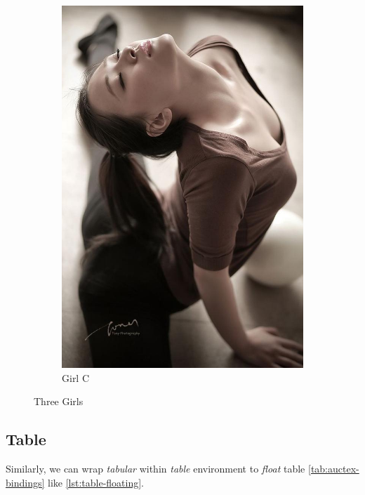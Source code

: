 \begin{figure}[tbp]
\begin{subfigure}[tbp]{0.3\linewidth}
    \includegraphics[width=\linewidth]{sub3}
    \caption{Girl C}
  \end{subfigure}
  \caption{Three Girls}
  \label{fig:three-girsl}
\end{figure}

\subsection{Table}
\label{sec:table}

Similarly, we can wrap \textit{tabular} within \textit{table}
environment to \textit{float} table \ref{tab:auctex-bindings} like
\ref{lst:table-floating}.

